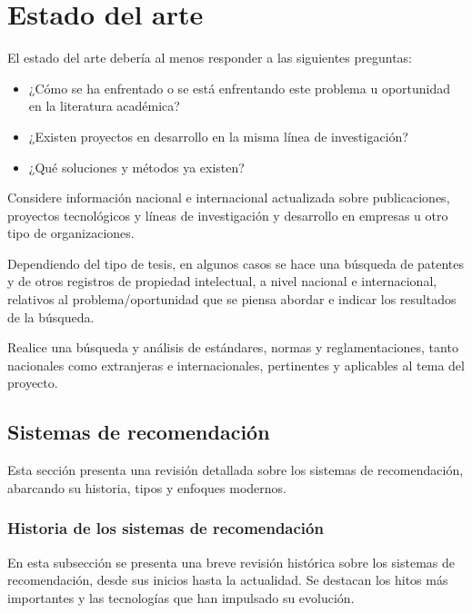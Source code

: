 
\chapter{Estado del arte} %
\label{sec:Estado Arte} %

El estado del arte debería al menos responder a las siguientes preguntas:
\begin{itemize}
	\item ¿Cómo se ha enfrentado o se está enfrentando este problema u oportunidad en la literatura académica? 
	\item ¿Existen proyectos en desarrollo en la misma línea de investigación? 
	\item ¿Qué soluciones y métodos ya existen? 
\end{itemize}

Considere información nacional e internacional actualizada sobre publicaciones, proyectos tecnológicos y líneas de investigación y desarrollo en empresas u otro tipo de organizaciones. 

Dependiendo del tipo de tesis, en algunos casos se hace una búsqueda de patentes y de otros registros de propiedad intelectual, a nivel nacional e internacional, relativos al problema/oportunidad que se piensa abordar e indicar los resultados de la búsqueda. 

Realice una búsqueda y análisis de estándares, normas y reglamentaciones, tanto nacionales como extranjeras e internacionales, pertinentes y aplicables al tema del proyecto.

\newpage

\section{Sistemas de recomendación}

	Esta sección presenta una revisión detallada sobre los sistemas de recomendación, abarcando su historia, tipos y enfoques modernos.

	\subsection{Historia de los sistemas de recomendación}
	En esta subsección se presenta una breve revisión histórica sobre los sistemas de recomendación, desde sus inicios hasta la actualidad. Se destacan los hitos más importantes y las tecnologías que han impulsado su evolución.

